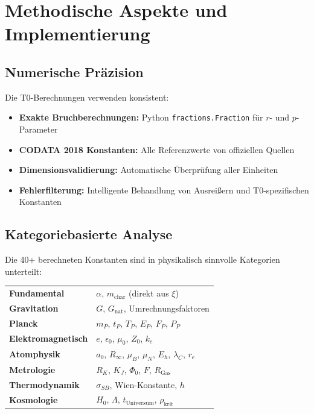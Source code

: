 	\section{Methodische Aspekte und Implementierung}
	
	\subsection{Numerische Präzision}
	
	Die T0-Berechnungen verwenden konsistent:
	
	\begin{itemize}
		\item \textbf{Exakte Bruchberechnungen:} Python \texttt{fractions.Fraction} für $r$- und $p$-Parameter
		\item \textbf{CODATA 2018 Konstanten:} Alle Referenzwerte von offiziellen Quellen
		\item \textbf{Dimensionsvalidierung:} Automatische Überprüfung aller Einheiten
		\item \textbf{Fehlerfilterung:} Intelligente Behandlung von Ausreißern und T0-spezifischen Konstanten
	\end{itemize}
	
	\subsection{Kategoriebasierte Analyse}
	
	Die 40+ berechneten Konstanten sind in physikalisch sinnvolle Kategorien unterteilt:
	
	\begin{center}
		\begin{tabular}{ll}
			\textbf{Fundamental} & $\alpha$, $m_{\text{char}}$ (direkt aus $\xi$) \\
			\textbf{Gravitation} & $G$, $G_{\text{nat}}$, Umrechnungsfaktoren \\
			\textbf{Planck} & $m_P$, $t_P$, $T_P$, $E_P$, $F_P$, $P_P$ \\
			\textbf{Elektromagnetisch} & $e$, $\epsilon_0$, $\mu_0$, $Z_0$, $k_e$ \\
			\textbf{Atomphysik} & $a_0$, $R_\infty$, $\mu_B$, $\mu_N$, $E_h$, $\lambda_C$, $r_e$ \\
			\textbf{Metrologie} & $R_K$, $K_J$, $\Phi_0$, $F$, $R_{\text{Gas}}$ \\
			\textbf{Thermodynamik} & $\sigma_{SB}$, Wien-Konstante, $h$ \\
			\textbf{Kosmologie} & $H_0$, $\Lambda$, $t_{\text{Universum}}$, $\rho_{\text{krit}}$ \\
		\end{tabular}
	\end{center}
	
